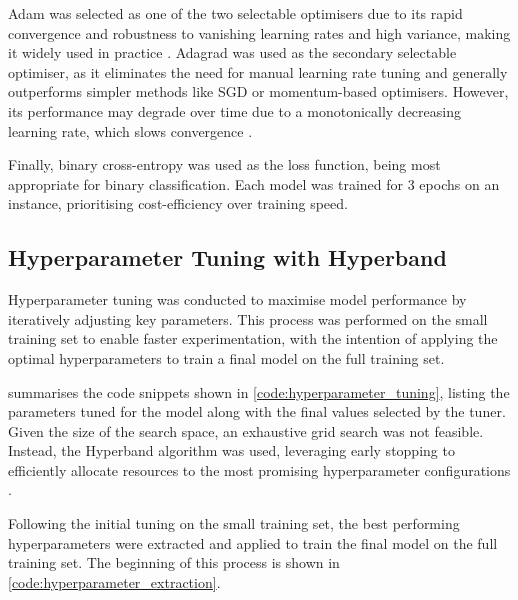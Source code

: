 Adam was selected as one of the two selectable optimisers due to its rapid convergence and robustness to vanishing learning rates and high variance, making it widely used in practice \cite{RAIAAN2024100470}. Adagrad was used as the secondary selectable optimiser, as it eliminates the need for manual learning rate tuning and generally outperforms simpler methods like SGD or momentum-based optimisers. However, its performance may degrade over time due to a monotonically decreasing learning rate, which slows convergence \cite{RAIAAN2024100470}.

Finally, binary cross-entropy was used as the loss function, being most appropriate for binary classification. Each model was trained for 3 epochs on an  instance, prioritising cost-efficiency over training speed.


\newpage

\subsection{Hyperparameter Tuning with Hyperband}

Hyperparameter tuning was conducted to maximise model performance by iteratively adjusting key parameters. This process was performed on the small training set to enable faster experimentation, with the intention of applying the optimal hyperparameters to train a final model on the full training set.

 summarises the code snippets shown in \cref{code:hyperparameter_tuning}, listing the parameters tuned for the model along with the final values selected by the tuner. Given the size of the search space, an exhaustive grid search was not feasible. Instead, the Hyperband algorithm was used, leveraging early stopping to efficiently allocate resources to the most promising hyperparameter configurations \cite{hyperband}.

Following the initial tuning on the small training set, the best performing hyperparameters were extracted and applied to train the final model on the full training set. The beginning of this process is shown in \cref{code:hyperparameter_extraction}.


